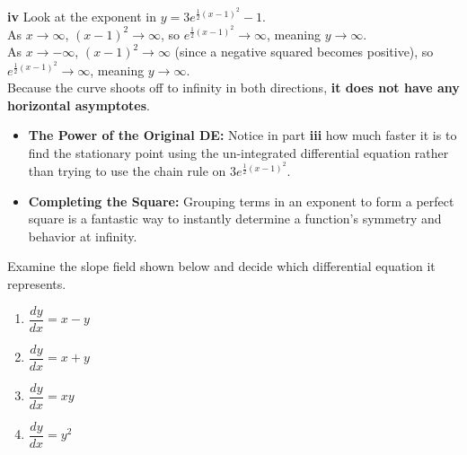 \begin{solution}
\vspace{0.3cm}
\textbf{iv} Look at the exponent in $y = 3e^{\frac{1}{2}(x-1)^2} - 1$. \\
As $x \to \infty$, $(x-1)^2 \to \infty$, so $e^{\frac{1}{2}(x-1)^2} \to \infty$, meaning \textbf{$y \to \infty$}. \\
As $x \to -\infty$, $(x-1)^2 \to \infty$ (since a negative squared becomes positive), so $e^{\frac{1}{2}(x-1)^2} \to \infty$, meaning \textbf{$y \to \infty$}. \\
Because the curve shoots off to infinity in both directions, \textbf{it does not have any horizontal asymptotes}.
\end{solution}

\begin{takeaways}
\begin{itemize}[leftmargin=*]
    \item \textbf{The Power of the Original DE:} Notice in part \textbf{iii} how much faster it is to find the stationary point using the un-integrated differential equation rather than trying to use the chain rule on $3e^{\frac{1}{2}(x-1)^2}$.
    \item \textbf{Completing the Square:} Grouping terms in an exponent to form a perfect square is a fantastic way to instantly determine a function's symmetry and behavior at infinity. 
\end{itemize}
\end{takeaways}

\begin{problem}
Examine the slope field shown below and decide which differential equation it represents.

\begin{center}
\end{center}

\begin{enumerate}
    \item[(A)] $\dfrac{dy}{dx}=x-y$
    \item[(B)] $\dfrac{dy}{dx}=x+y$
    \item[(C)] $\dfrac{dy}{dx}=xy$
    \item[(D)] $\dfrac{dy}{dx}=y^2$
\end{enumerate}
\end{problem}

